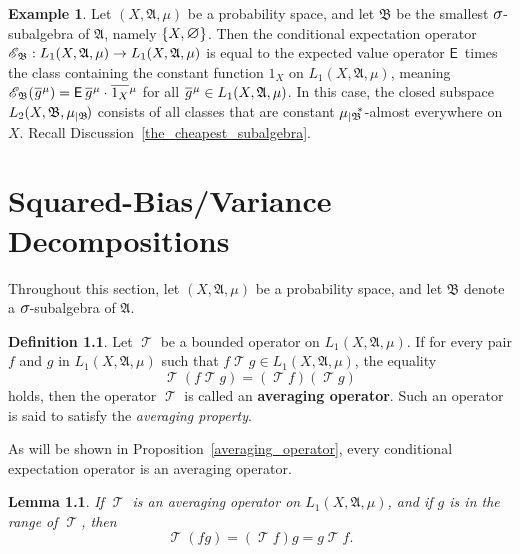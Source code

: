 \documentclass[
twoside=true,
paper=letter,
fontsize=11pt,
pagesize=auto,
leqno,
openany,
headsepline,
overfullrule,
]{scrbook}
\theoremstyle{plain}
\theoremstyle{plain}
\newtheorem{lemma}[thm]{Lemma}
\theoremstyle{definition}
\newtheorem{defn}[thm]{Definition}
\newtheorem{example}[thm]{Example}
\theoremstyle{bfnoteitalic}
\theoremstyle{bfnoteroman}
\newcommand{\term}[1]{\textbf{#1}\index{#1}}
\newcommand{\sigalg}[1]{\mathfrak{#1}}
\newcommand{\cali}[1]{\mathscr{#1}}
\newcommand{\sfop}[1]{\mathsf{#1}}
\newcommand{\expval}{\sfop{E}\,}
\newcommand{\condexpop}[1]{\mathop{\cali{E}\hspace{-1pt}}\nolimits_{#1}}
\newcommand{\textsigma}{\hbox{\large{$\sigma$}}\kern-1pt}
\newcommand{\restrictedto}[1]{_{\lvert#1}\kern-1.5pt}
\newcommand{\mtset}{\hbox{\large{$\varnothing$}}}
\newcommand{\sigmaalgebra}{\sigalg{A}}
\newcommand{\sigmaalgebraii}{\sigalg{B}}
\newcommand{\Psubstar}[1]{\measure\restrictedto{#1}\kern-2pt^*}
\newcommand{\Lone}{L_1(\measurespace, \sigmaalgebra, \measure)}
\newcommand{\OpT}{\mathop{\cali T}}
\newcommand{\oneonomega}{1_\measurespace}
\newcommand{\sigalgb}{\sigmaalgebraii}
\newcommand{\function}{f}
\newcommand{\functionii}{g}
\newcommand{\measurespace}{X}
\newcommand{\measure}{\mu}
\newcommand*\xbar[1]{%
   \hbox{%
     \vbox{%
       \hrule height 0.4pt %
       \kern0.4ex%
       \hbox{%
         \ensuremath{#1}%
       }%
     }%
   }%
}
\newcommand{\lebclass}[1]{\hspace{.5pt}\xbar{#1}\hspace{0.5pt}}
\newcommand{\ellclass}[2]{\lebclass{#1}^{#2}}
\begin{document}
\begin{example}
Let $(\measurespace, \sigmaalgebra,\measure)$ be a  probability space, and let 
$\sigmaalgebraii$ be the smallest $\textsigma$-subalgebra of $\sigmaalgebra$, namely $\{\measurespace, \mtset\}$.
Then the conditional expectation operator 
$\condexpop{\sigmaalgebraii} :\Lone\to\Lone$ is equal to the expected value operator $\expval$ times the class containing the constant function $\oneonomega$
on
$\Lone$, meaning
$\condexpop{\sigmaalgebraii}(\ellclass{\functionii}{\measure}) 
= \expval{\ellclass{\functionii}{\measure}}\cdot\ellclass{\oneonomega}{\measure}$
for all $\ellclass{\functionii}{\measure} \in \Lone$. In this case, the closed subspace $L_2(\measurespace, \sigmaalgebraii,\measure\restrictedto{\sigmaalgebraii})$ consists of all classes that are constant $\Psubstar{\sigalgb}$-almost everywhere on $\measurespace$. 
Recall Discussion~\ref{the_cheapest_subalgebra}.
\end{example}





\chapter[Squared-Bias/Variance]{Squared-Bias/Variance Decompositions}
%

Throughout this section, let $(\measurespace, \sigmaalgebra,\measure)$ be a  probability space, and let 
$\sigmaalgebraii$ denote a $\textsigma$-subalgebra of $\sigmaalgebra$.



\begin{defn}
Let $\OpT$ be a bounded operator on $\Lone$. If for every pair $\function$ and $\functionii$ in $\Lone$  such that $\function\OpT \functionii\in\Lone$, the equality
\[
\OpT(\function\OpT \functionii) = (\OpT \function)( \OpT \functionii)
\]
holds, then the operator $\OpT$ is called an \term{averaging operator}. Such an operator is said to satisfy the \emph{averaging property}.
\end{defn}


As will be shown in Proposition~\ref{averaging_operator}, every conditional expectation operator is an averaging operator.

\begin{lemma}\label{range_factors_out}
If $\OpT$ is an averaging operator on $\Lone$, and if $\functionii$ is in the range of $\OpT$, then 
\[
\OpT(\function\functionii) = (\OpT \function)\functionii = \functionii\OpT \function.
\]
\end{lemma}
\end{document}
